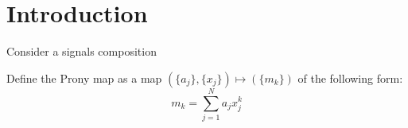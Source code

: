 \section{Introduction}
Consider a signals composition
$$
$$

Define the Prony map as a map $(\{a_j\}, \{x_j\}) \mapsto (\{m_k\})$ of the following form:
$$
m_k = \sum_{j=1}^N a_j x_j^k
$$
  
  
  
  
  